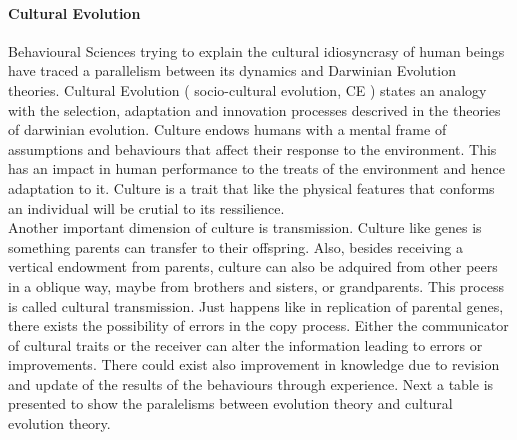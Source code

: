 \documentclass[11pt,oneside,a4paper,openright]{report}
\begin{document}
\paragraph{Cultural Evolution}
\label{sec:CultEvol}
Behavioural Sciences trying to explain the cultural idiosyncrasy of human beings have traced a parallelism between its dynamics and Darwinian Evolution theories. Cultural Evolution \cite[ch11.]{Dawkins1990}\cite{Stanford_CultEvol}( socio-cultural evolution, CE ) states an analogy with the selection, adaptation and innovation processes descrived in the theories of darwinian evolution. Culture endows humans with a mental frame of assumptions and behaviours that affect their response to the environment. This has an impact in human performance to the treats of the environment and hence adaptation to it. Culture is a trait that like the physical features that conforms an individual will be crutial to its ressilience.\\ 
Another important dimension of culture is transmission. Culture like genes is something parents can transfer to their offspring. Also, besides receiving a vertical endowment from parents, culture can also be adquired from other peers in a oblique way, maybe from brothers and sisters, or grandparents. This process is called cultural transmission. Just happens like in replication of parental genes, there exists the possibility of errors in the copy process. Either the communicator of cultural traits or the receiver can alter the information leading to errors or improvements. There could exist also improvement in knowledge due to revision and update of the results of the behaviours through experience. Next a table is presented to show the paralelisms between evolution theory and cultural evolution theory.
\end{document}
